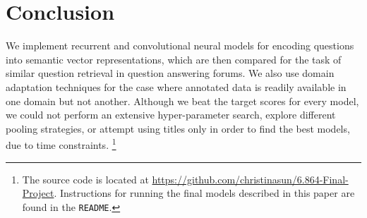 \documentclass[11pt,a4paper]{article}
\begin{document}
\section{Conclusion}
We implement recurrent and convolutional neural models for encoding questions into semantic vector representations, which are then compared for the task of similar question retrieval in question answering forums. We also use domain adaptation techniques for the case where annotated data is readily available in one domain but not another. Although we beat the target scores for every model, we could not perform an extensive hyper-parameter search, explore different pooling strategies, or attempt using titles only in order to find the best models, due to time constraints. \footnote{The source code is located at \url{https://github.com/christinasun/6.864-Final-Project}. Instructions for running the final models described in this paper are found in the \texttt{README}.}

\nocite{*}


\end{document}
